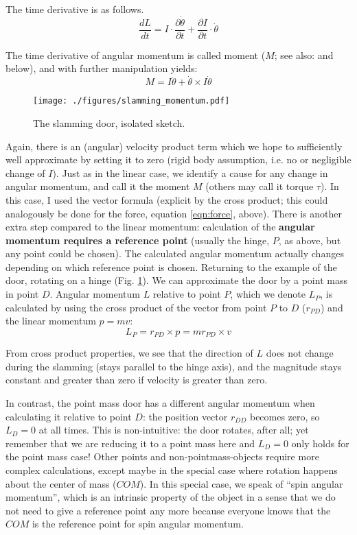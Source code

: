 The time derivative is as follows.
\[\frac{dL}{dt} = I \cdot \frac{\partial \dot \theta}{\partial t} + \frac{\partial I}{\partial t} \cdot \dot \theta\]

The time derivative of angular momentum is called moment (\(M\); see also: \citet{WikipediaNewtonEuler,WikipediaTorque} and below), and with further manipulation \citep[details in][p. 242, eqn. 8.23; otherwise see Fig. \ref{fig:miracle}]{Lynch2017} yields:
\begin{equation}\label{eqn:moment}
M = I \ddot\theta + \dot\theta \times I\dot\theta
\end{equation}



\begin{figure}[p]
\centering
\texttt{[image: ./figures/slamming\_momentum.pdf]}
\caption{\label{fig:slamming_momentum}The slamming door, isolated sketch.}
\end{figure}

Again, there is an (angular) velocity product term which we hope to sufficiently well approximate by setting it to zero (rigid body assumption, i.e. no or negligible change of \(I\)).
Just as in the linear case, we identify a cause for any change in angular momentum, and call it the moment \(M\) (others may call it torque \(\tau\)).
In this case, I used the vector formula (explicit by the cross product; this could analogously be done for the force, equation \eqref{eqn:force}, above).
There is another extra step compared to the linear momentum: calculation of the \textbf{angular momentum requires a reference point} (usually the hinge, \(P\), as above, but any point could be chosen).
The calculated angular momentum actually changes depending on which reference point is chosen.
Returning to the example of the door, rotating on a hinge (Fig. \ref{fig:slamming_momentum}).
We can approximate the door by a point mass in point \(D\).
Angular momentum \(L\) relative to point \(P\), which we denote \(L_P\), is calculated by using the cross product of the vector from point \(P\) to \(D\) (\(r_{PD}\)) and the linear momentum \(p=mv\):
\[L_{P} = r_{PD} \times p = m r_{PD} \times v \]

From cross product properties, we see that the direction of \(L\) does not change during the slamming (stays parallel to the hinge axis), and the magnitude stays constant and greater than zero if velocity is greater than zero.

In contrast, the point mass door has a different angular momentum when calculating it relative to point \(D\): the position vector \(r_{DD}\) becomes zero, so \(L_{D} = 0\) at all times.
This is non-intuitive: the door rotates, after all; yet remember that we are reducing it to a point mass here and \(L_{D} = 0\) only holds for the point mass case!
Other points and non-pointmass-objects require more complex calculations, except maybe in the special case where rotation happens about the center of mass (\(COM\)).
In this special case, we speak of ``spin angular momentum'', which is an intrinsic property of the object in a sense that we do not need to give a reference point any more because everyone knows that the \(COM\) is the reference point for spin angular momentum.


